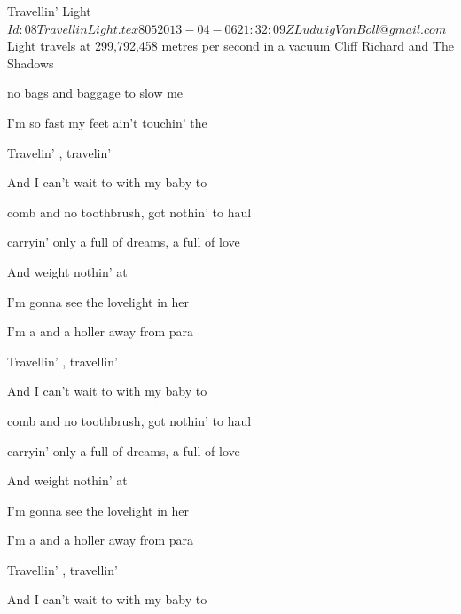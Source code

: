 \begin{SBSong}{Travellin' Light}
  {$Id: 08TravellinLight.tex 805 2013-04-06 21:32:09Z LudwigVanBoll@gmail.com $}
  {Light travels at 299,792,458 metres per second in a vacuum}
  {Cliff Richard and The Shadows}
  \begin{SBVerse}
	 no bags and baggage to slow me 
	
	I'm  so fast my feet ain't touchin' the 
	
	Travelin' , travelin' 
	
	And I  can't wait to  with my baby to 
  \end{SBVerse}
  \begin{SBChorus}
	 comb and no toothbrush,  got nothin' to haul
	
	 carryin' only a   full of dreams, a   full of love
	
	And   weight nothin' at 
  \end{SBChorus}
  \begin{SBVerse}
	 I'm gonna see the lovelight in her 
	
	I'm a  and a holler away from para
	
	Travellin' , travellin' 
	
	And I  can't wait to  with my baby to 
 \end{SBVerse}
  \begin{SBChorus}
	 comb and no toothbrush,  got nothin' to haul
	
	 carryin' only a   full of dreams, a   full of love
	
	And   weight nothin' at 
  \end{SBChorus}
  \begin{SBVerse}
	 I'm gonna see the lovelight in her 
	
	I'm a  and a holler away from para
	
	Travellin' , travellin' 
	
	And I  can't wait to  with my baby to 
  \end{SBVerse}
\end{SBSong}